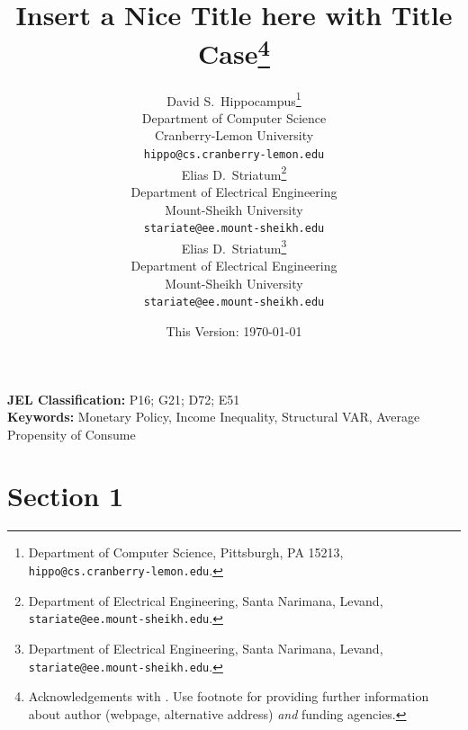 \documentclass[11pt]{article}
\date{This Version: \today}
\title{Insert a Nice Title here with Title Case\thanks{Acknowledgements with \lipsum[2]. Use footnote for providing further information about author (webpage, alternative address) \emph{and} funding agencies.}}
\author{
    {David S.~Hippocampus}\thanks{Department of Computer Science, Pittsburgh, PA 15213, \texttt{hippo@cs.cranberry-lemon.edu}.} \\
    Department of Computer Science\\
    Cranberry-Lemon University\\
    \texttt{hippo@cs.cranberry-lemon.edu} \\
    \And
    {Elias D.~Striatum}\thanks{Department of Electrical Engineering, Santa Narimana, Levand, \texttt{stariate@ee.mount-sheikh.edu}.} \\
    Department of Electrical Engineering\\
    Mount-Sheikh University\\
    \texttt{stariate@ee.mount-sheikh.edu} \\
    \AND
    {Elias D.~Striatum}\thanks{Department of Electrical Engineering, Santa Narimana, Levand, \texttt{stariate@ee.mount-sheikh.edu}.} \\
    Department of Electrical Engineering\\
    Mount-Sheikh University\\
    \texttt{stariate@ee.mount-sheikh.edu} \\
}
\begin{document}
\maketitle

\draftdisclaimer

\renewcommand{\thefootnote}{\arabic{footnote}}
\setcounter{footnote}{0} 


\begin{abstract}
    \noindent\lipsum[1]
\end{abstract}
{\textbf{JEL Classification:} P16; G21; D72; E51} \\
{\textbf{Keywords:} Monetary Policy, Income Inequality, Structural VAR, Average Propensity of Consume}

\clearpage\newpage


\tableofcontents
\listoftodos

\clearpage
\newpage


\section{Section 1}
\end{document}
